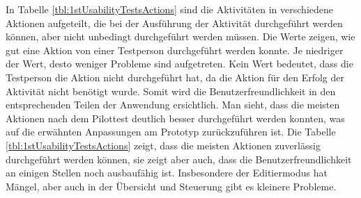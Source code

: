 In Tabelle \ref{tbl:1stUsabilityTestsActions} sind die Aktivitäten in verschiedene Aktionen aufgeteilt, die bei der Ausführung der Aktivität durchgeführt werden können, aber nicht unbedingt durchgeführt werden müssen. Die Werte zeigen, wie gut eine Aktion von einer Testperson durchgeführt werden konnte. Je niedriger der Wert, desto weniger Probleme sind aufgetreten. Kein Wert bedeutet, dass die Testperson die Aktion nicht durchgeführt hat, da die Aktion für den Erfolg der Aktivität nicht benötigt wurde. Somit wird die Benutzerfreundlichkeit in den entsprechenden Teilen der Anwendung ersichtlich. Man sieht, dass die meisten Aktionen nach dem Pilottest deutlich besser durchgeführt werden konnten, was auf die erwähnten Anpassungen am Prototyp zurückzuführen ist. Die Tabelle \ref{tbl:1stUsabilityTestsActions} zeigt, dass die meisten Aktionen zuverlässig durchgeführt werden können, sie zeigt aber auch, dass die Benutzerfreundlichkeit an einigen Stellen noch ausbaufähig ist. Insbesondere der Editiermodus hat Mängel, aber auch in der Übersicht und Steuerung gibt es kleinere Probleme.


